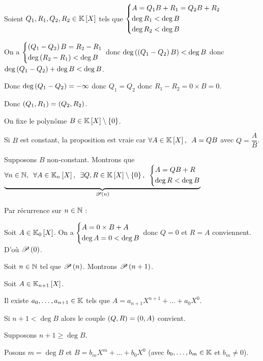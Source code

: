 \begin{dem}
\unicite

Soient \(Q_1,R_1,Q_2,R_2\in\poly\) tels que \(\begin{dcases}A=Q_1B+R_1=Q_2B+R_2 \\ \deg R_1<\deg B \\ \deg R_2<\deg B\end{dcases}\)

On a \(\begin{dcases}\paren{Q_1-Q_2}B=R_2-R_1 \\ \deg\paren{R_2-R_1}<\deg B\end{dcases}\) donc \(\deg\paren{\paren{Q_1-Q_2}B}<\deg B\) donc \(\deg\paren{Q_1-Q_2}+\deg B<\deg B\).

Donc \(\deg\paren{Q_1-Q_2}=\minf\) donc \(Q_1=Q_2\) donc \(R_1-R_2=0\times B=0\).

Donc \(\paren{Q_1,R_1}=\paren{Q_2,R_2}\).

\existence

On fixe le polynôme \(B\in\poly\excluant\accol{0}\).

Si \(B\) est constant, la proposition est vraie car \(\quantifs{\forall A\in\poly}A=QB\) avec \(Q=\dfrac{A}{B}\).

Supposons \(B\) non-constant. Montrons que \(\underbrace{\quantifs{\forall n\in\N;\forall A\in\poly[\K_n];\exists Q,R\in\poly\excluant\accol{0}}\begin{dcases}A=QB+R \\ \deg R<\deg B\end{dcases}}_{\P{n}}\)

Par récurrence sur \(n\in\N\) :

Soit \(A\in\poly[\K_0]\). On a \(\begin{dcases}A=0\times B+A \\ \deg A=0<\deg B\end{dcases}\) donc \(Q=0\) et \(R=A\) conviennent. D'où \(\P{0}\).

Soit \(n\in\N\) tel que \(\P{n}\). Montrons \(\P{n+1}\).

Soit \(A\in\poly[\K_{n+1}]\).

Il existe \(a_0,\dots,a_{n+1}\in\K\) tels que \(A=a_{n+1}X^{n+1}+\dots+a_0X^0\).

Si \(n+1<\deg B\) alors le couple \(\paren{Q,R}=\paren{0,A}\) convient.

Supposons \(n+1\geq\deg B\).

Posons \(m=\deg B\) et \(B=b_mX^m+\dots+b_0X^0\) (avec \(b_0,\dots,b_m\in\K\) et \(b_m\not=0\)).


\end{dem}
